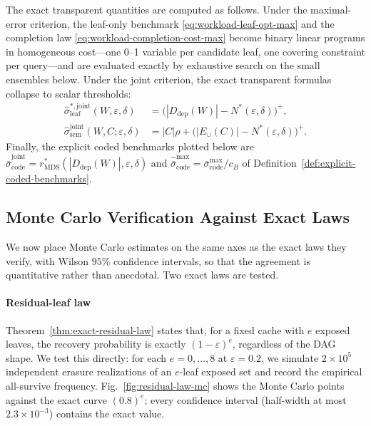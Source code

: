 \documentclass[journal]{IEEEtran}
\numberwithin{equation}{section}
\begin{document}
The exact transparent quantities are computed as follows.  Under the
maximal-error criterion, the leaf-only benchmark
\eqref{eq:workload-leaf-opt-max} and the completion law
\eqref{eq:workload-completion-cost-max} become binary linear programs in
homogeneous cost---one 0--1 variable per candidate leaf, one covering
constraint per query---and are evaluated exactly by exhaustive search on the
small ensembles below.  Under the joint criterion, the exact transparent
formulas collapse to scalar thresholds:
\begin{align}
  \widehat{\sigma}_{\mathrm{leaf}}^{*,\mathrm{joint}}
  (W,\varepsilon,\delta)
  &=
  \bigl(
    |D_{\mathrm{dep}}(W)|-N^*(\varepsilon,\delta)
  \bigr)^+,
\label{eq:numerical-leaf-joint}\\
  \widehat{\sigma}_{\mathrm{sem}}^{\mathrm{joint}}
  (W,C;\varepsilon,\delta)
  &=
  |C|\rho
  +
  \bigl(
    |E_{\cup}(C)|-N^*(\varepsilon,\delta)
  \bigr)^+.
\label{eq:numerical-sem-joint}
\end{align}
Finally, the explicit coded benchmarks plotted below are
\(\widehat{\bar{\sigma}}_{\mathrm{code}}^{\mathrm{joint}}
=r_{\mathrm{MDS}}^{*}(|D_{\mathrm{dep}}(W)|,\varepsilon,\delta)\) and
\(\widehat{\bar{\sigma}}_{\mathrm{code}}^{\max}
=\bar{\sigma}_{\mathrm{code}}^{\max}/c_B\) of
Definition~\ref{def:explicit-coded-benchmarks}.

\subsection{Monte Carlo Verification Against Exact Laws}
\label{subsec:numerical-mc}

We now place Monte Carlo estimates on the same axes as the exact laws they
verify, with Wilson \(95\%\) confidence intervals, so that the agreement is
quantitative rather than anecdotal.  Two exact laws are tested.

\paragraph*{Residual-leaf law}
Theorem~\ref{thm:exact-residual-law} states that, for a fixed cache with
\(e\) exposed leaves, the recovery probability is exactly
\((1-\varepsilon)^{e}\), regardless of the DAG shape.  We test this directly:
for each \(e=0,\ldots,8\) at \(\varepsilon=0.2\), we simulate \(2\times10^{5}\)
independent erasure realizations of an \(e\)-leaf exposed set and record the
empirical all-survive frequency.  Fig.~\ref{fig:residual-law-mc} shows the
Monte Carlo points against the exact curve \((0.8)^{e}\); every confidence
interval (half-width at most \(2.3\times10^{-3}\)) contains the exact value.
\end{document}
